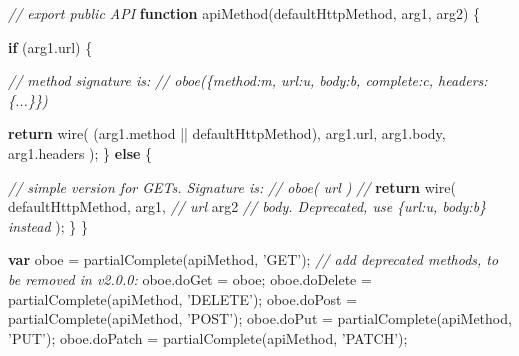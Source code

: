 \documentclass[12pt, ]{article}
\newenvironment{Shaded}{}{}
\newcommand{\KeywordTok}[1]{\textcolor[rgb]{0.00,0.44,0.13}{\textbf{{#1}}}}
\newcommand{\StringTok}[1]{\textcolor[rgb]{0.25,0.44,0.63}{{#1}}}
\newcommand{\CommentTok}[1]{\textcolor[rgb]{0.38,0.63,0.69}{\textit{{#1}}}}
\newcommand{\OtherTok}[1]{\textcolor[rgb]{0.00,0.44,0.13}{{#1}}}
\newcommand{\FunctionTok}[1]{\textcolor[rgb]{0.02,0.16,0.49}{{#1}}}
\newcommand{\NormalTok}[1]{{#1}}
\begin{document}
\begin{Shaded}
\begin{Highlighting}[]
\CommentTok{// export public API}
\KeywordTok{function} \FunctionTok{apiMethod}\NormalTok{(defaultHttpMethod, arg1, arg2) \{}

   \KeywordTok{if} \NormalTok{(}\OtherTok{arg1}\NormalTok{.}\FunctionTok{url}\NormalTok{) \{}

      \CommentTok{// method signature is:}
      \CommentTok{//    oboe(\{method:m, url:u, body:b, complete:c, headers:\{...\}\})}

      \KeywordTok{return} \FunctionTok{wire}\NormalTok{(}
         \NormalTok{(}\OtherTok{arg1}\NormalTok{.}\FunctionTok{method} \NormalTok{|| defaultHttpMethod),}
         \OtherTok{arg1}\NormalTok{.}\FunctionTok{url}\NormalTok{,}
         \OtherTok{arg1}\NormalTok{.}\FunctionTok{body}\NormalTok{,}
         \OtherTok{arg1}\NormalTok{.}\FunctionTok{headers}
      \NormalTok{);}
   \NormalTok{\} }\KeywordTok{else} \NormalTok{\{}

      \CommentTok{//  simple version for GETs. Signature is:}
      \CommentTok{//    oboe( url )            }
      \CommentTok{//                                }
      \KeywordTok{return} \FunctionTok{wire}\NormalTok{(}
         \NormalTok{defaultHttpMethod,}
         \NormalTok{arg1, }\CommentTok{// url}
         \NormalTok{arg2  }\CommentTok{// body. Deprecated, use \{url:u, body:b\} instead}
      \NormalTok{);}
   \NormalTok{\}}
\NormalTok{\}}

\KeywordTok{var} \NormalTok{oboe = }\FunctionTok{partialComplete}\NormalTok{(apiMethod, }\StringTok{'GET'}\NormalTok{);}
\CommentTok{// add deprecated methods, to be removed in v2.0.0:}
\OtherTok{oboe}\NormalTok{.}\FunctionTok{doGet}    \NormalTok{= oboe;}
\OtherTok{oboe}\NormalTok{.}\FunctionTok{doDelete} \NormalTok{= }\FunctionTok{partialComplete}\NormalTok{(apiMethod, }\StringTok{'DELETE'}\NormalTok{);}
\OtherTok{oboe}\NormalTok{.}\FunctionTok{doPost}   \NormalTok{= }\FunctionTok{partialComplete}\NormalTok{(apiMethod, }\StringTok{'POST'}\NormalTok{);}
\OtherTok{oboe}\NormalTok{.}\FunctionTok{doPut}    \NormalTok{= }\FunctionTok{partialComplete}\NormalTok{(apiMethod, }\StringTok{'PUT'}\NormalTok{);}
\OtherTok{oboe}\NormalTok{.}\FunctionTok{doPatch}  \NormalTok{= }\FunctionTok{partialComplete}\NormalTok{(apiMethod, }\StringTok{'PATCH'}\NormalTok{);}
\end{Highlighting}
\end{Shaded}

\pagebreak
\end{document}
